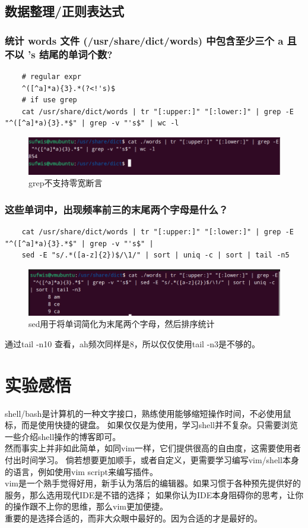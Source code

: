 \documentclass[UTF8]{ctexart}
\begin{document}
\subsection{数据整理/正则表达式}
\subsubsection{统计 words 文件 (/usr/share/dict/words) 中包含至少三个 a 且不以 's 结尾的单词个数?}
\begin{lstlisting}
	# regular expr
	^([^a]*a){3}.*(?<!'s)$
	# if use grep
	cat /usr/share/dict/words | tr "[:upper:]" "[:lower:]" | grep -E "^([^a]*a){3}.*$" | grep -v "'s$" | wc -l
\end{lstlisting}
\begin{figure}[H]
	\centering
	\includegraphics[width=0.7\linewidth]{figures/word_count.png}
	\caption{grep不支持零宽断言}
\end{figure}

\subsubsection{这些单词中，出现频率前三的末尾两个字母是什么？}
\begin{lstlisting}
	cat /usr/share/dict/words | tr "[:upper:]" "[:lower:]" | grep -E "^([^a]*a){3}.*$" | grep -v "'s$" |
	sed -E "s/.*([a-z]{2})$/\1/" | sort | uniq -c | sort | tail -n5
\end{lstlisting}
\begin{figure}[H]
	\centering
	\includegraphics[width=0.7\linewidth]{figures/tail3.png}
	\caption{sed用于将单词简化为末尾两个字母，然后排序统计}
\end{figure}
\indent 通过tail -n10 查看，ah频次同样是8，所以仅仅使用tail -n3是不够的。\\



\section{实验感悟}
\indent shell/bash是计算机的一种文字接口，熟练使用能够缩短操作时间，不必使用鼠标，而是使用快捷的键盘。
如果仅仅是为使用，学习shell并不复杂。只需要浏览一些介绍shell操作的博客即可。\\
\indent 然而事实上并非如此简单，如同vim一样，它们提供很高的自由度，这需要使用者付出时间学习。
倘若想要更加顺手，或者自定义，更需要学习编写vim/shell本身的语言，例如使用vim script来编写插件。\\
\indent vim是一个熟手觉得好用，新手认为落后的编辑器。如果习惯于各种预先提供好的服务，那么选用现代IDE是不错的选择；
如果你认为IDE本身阻碍你的思考，让你的操作跟不上你的思维，那么vim更加便捷。\\
\indent 重要的是选择合适的，而非大众眼中最好的。因为合适的才是最好的。\\
\end{document}
